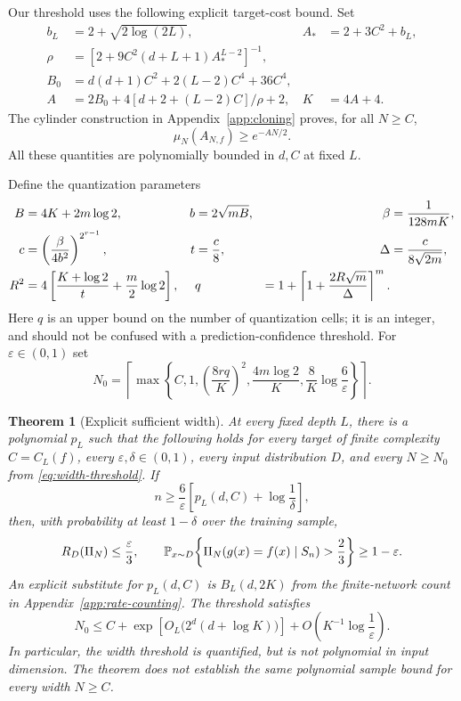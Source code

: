 \documentclass[11pt]{article}
\newtheorem{theorem}{Theorem}[section]\newtheorem{proposition}[theorem]{Proposition}
\theoremstyle{remark}\newtheorem{remark}[theorem]{Remark}
\begin{document}
Our threshold uses the following explicit target-cost bound. Set
\begin{align*}
 b_L&=2+\sqrt{2\log(2L)},& A_*&=2+3C^2+b_L,\\
 \rho&=[2+9C^2(d+L+1)A_*^{L-2}]^{-1},\\
 B_0&=d(d+1)C^2+2(L-2)C^4+36C^4,\\
 A&=2B_0+4[d+2+(L-2)C]/\rho+2,& K&=4A+4.
\end{align*}
The cylinder construction in Appendix~\ref{app:cloning} proves, for all
$N\geq C$,
\begin{equation}\label{eq:target-mass}
 \mu_N(A_{N,f})\geq e^{-AN/2}.
\end{equation}
All these quantities are polynomially bounded in $d,C$ at fixed $L$.

Define the quantization parameters
\begin{align}
 B&=4K+2m\log2,& b&=2\sqrt{mB},& \beta&=\frac{1}{128mK},\notag\\
 c&=\left(\frac{\beta}{4b^2}\right)^{2^{r-1}},&
 t&=\frac c8,& \Delta&=\frac{c}{8\sqrt{2m}},\notag\\
 R^2&=4\left[\frac{K+\log2}{t}+\frac m2\log2\right],&&
 q&=1+\left\lceil1+\frac{2R\sqrt m}{\Delta}\right\rceil^m.
 \label{eq:quantization-parameters}
\end{align}
Here $q$ is an upper bound on the number of quantization cells; it is an
integer, and should not be confused with a prediction-confidence threshold.
For $\varepsilon\in(0,1)$ set
\begin{equation}\label{eq:width-threshold}
 N_0=\left\lceil\max\left\{C,1,
 \left(\frac{8rq}{K}\right)^2,
 \frac{4m\log2}{K},\frac8K\log\frac6\varepsilon\right\}\right\rceil.
\end{equation}

\begin{theorem}[Explicit sufficient width]\label{thm:main}
At every fixed depth $L$, there is a polynomial $p_L$ such that the following
holds for every target of finite complexity $C=C_L(f)$, every
$\varepsilon,\delta\in(0,1)$, every input distribution $D$, and every
$N\geq N_0$ from \eqref{eq:width-threshold}.
If
\[
 n\geq\frac6\varepsilon\left[p_L(d,C)+\log\frac1\delta\right],
\]
then, with probability at least $1-\delta$ over the training sample,
\[
 R_D(\Pi_N)\leq\frac\varepsilon3,\qquad
 \mathbb P_{x\sim D}\!\left\{
 \Pi_N(g(x)=f(x)\mid S_n)>\frac23\right\}\geq1-\varepsilon.
\]
An explicit substitute for $p_L(d,C)$ is $B_L(d,2K)$ from the finite-network
count in Appendix~\ref{app:rate-counting}.
The threshold satisfies
\[
 N_0\leq C+\exp\!\left[O_L\bigl(2^d(d+\log K)\bigr)\right]
       +O\!\left(K^{-1}\log\frac1\varepsilon\right).
\]
In particular, the width threshold is quantified, but is not polynomial in
input dimension. The theorem does not establish the same polynomial sample
bound for every width $N\geq C$.
\end{theorem}
\end{document}
